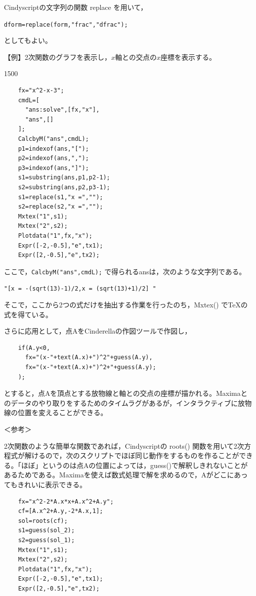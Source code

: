 \documentclass[papersize,a4paper,12pt,uplatex]{jsarticle}
\begin{document}
\begin{description}
Cindyscriptの文字列の関数 replace を用いて，

\hspace{10mm} \verb|dform=replace(form,"frac","dfrac");| 
      
としてもよい。


\vspace{\baselineskip}
【例】2次関数のグラフを表示し，$x$軸との交点の$x$座標を表示する。

\begin{layer}{150}{0}
\end{layer}
\begin{verbatim}
    fx="x^2-x-3";
    cmdL=[
      "ans:solve",[fx,"x"],
      "ans",[]
    ];
    CalcbyM("ans",cmdL);
    p1=indexof(ans,"[");
    p2=indexof(ans,",");
    p3=indexof(ans,"]");
    s1=substring(ans,p1,p2-1);
    s2=substring(ans,p2,p3-1);
    s1=replace(s1,"x =","");
    s2=replace(s2,"x =","");
    Mxtex("1",s1);
    Mxtex("2",s2);
    Plotdata("1",fx,"x");
    Expr([-2,-0.5],"e",tx1);
    Expr([2,-0.5],"e",tx2);
\end{verbatim}

ここで，\verb|CalcbyM("ans",cmdL);| で得られるansは，次のような文字列である。
  
        \verb|"[x = -(sqrt(13)-1)/2,x = (sqrt(13)+1)/2] "|
        
そこで，ここから2つの式だけを抽出する作業を行ったのち，Mxtex() でTeXの式を得ている。

さらに応用として，点AをCinderellaの作図ツールで作図し，
\begin{verbatim}
    if(A.y<0,
      fx="(x-"+text(A.x)+")^2"+guess(A.y),
      fx="(x-"+text(A.x)+")^2+"+guess(A.y);
    );
\end{verbatim}
とすると，点Aを頂点とする放物線と軸との交点の座標が描かれる。Maximaとのデータのやり取りをするためのタイムラグがあるが，インタラクティブに放物線の位置を変えることができる。

\vspace{\baselineskip}
＜参考＞

  2次関数のような簡単な関数であれば，Cindyscriptの roots() 関数を用いて2次方程式が解けるので，次のスクリプトでほぼ同じ動作をするものを作ることができる。「ほぼ」というのは点Aの位置によっては，guess()で解釈しきれないことがあるためである。Maximaを使えば数式処理で解を求めるので，Aがどこにあってもきれいに表示できる。
\begin{verbatim}
    fx="x^2-2*A.x*x+A.x^2+A.y";
    cf=[A.x^2+A.y,-2*A.x,1];
    sol=roots(cf);
    s1=guess(sol_2);
    s2=guess(sol_1);
    Mxtex("1",s1);
    Mxtex("2",s2);
    Plotdata("1",fx,"x");
    Expr([-2,-0.5],"e",tx1);
    Expr([2,-0.5],"e",tx2);
\end{verbatim}

\end{description}
\end{document}
